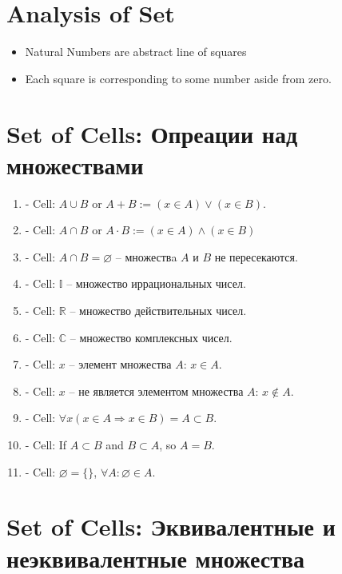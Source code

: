 \documentclass{spaceA}
\begin{document}
\section{Analysis of Set}

\begin{itemize}
  \item Natural Numbers are abstract line of squares
  \item Each square is corresponding to some number aside from zero.
\end{itemize}

\section{Set of Cells: Опреации над множествами}

\begin{enumerate}
  \item - Cell: $A \cup B$ or $A + B := \left (x \in A \right ) \lor \left (x \in B \right )$.
  \item - Cell: $A \cap B$ or $A \cdot B := \left (x \in A \right ) \land \left (x \in B \right )$
  \item - Cell: $A \cap B = \varnothing$ -- множествa $A$ и $B$ не пересекаются.
  \item - Cell: $\mathbb{I}$ -- множество иррациональных чисел.
  \item - Cell: $\mathbb{R}$ -- множество действительных чисел.
  \item - Cell: $\mathbb{C}$ -- множество комплексных чисел.
  \item - Cell: $x$ -- элемент множества $A$: $x \in A$.
  \item - Cell: $x$ -- не является элементом множества $A$: $x \notin A$.
  \item - Cell: $\forall x \left ( x \in A \Rightarrow x \in B \right ) = A \subset B$.
  \item - Cell: If $A \subset B$ and $B \subset A$, so $A = B$.
  \item - Cell: $\varnothing = \{ \}$, $\forall A: \varnothing \in A$.
\end{enumerate}

\section{Set of Cells: Эквивалентные и неэквивалентные множества}
\end{document}
